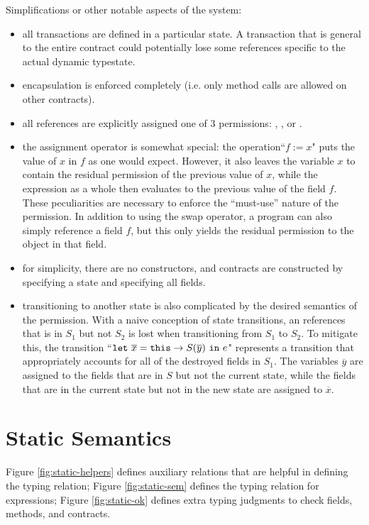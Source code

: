 \documentclass[runningheads,a4paper]{llncs}
\begin{document}
Simplifications or other notable aspects of the system:
\begin{itemize}
\item all transactions are defined in a particular state. A transaction that is general to the entire contract could potentially lose some \ownedS{} references specific to the actual dynamic typestate.
\item encapsulation is enforced completely (i.e. only method calls are allowed on other contracts).
\item all references are explicitly assigned one of 3 permissions: \readonlyS, \ownedS, or \sharedS.
\item the assignment operator is somewhat special: the operation``$f := x$" puts the value of $x$ in $f$ as one would expect. However, it also leaves the variable $x$ to contain the residual permission of the previous value of $x$, while the expression as a whole then evaluates to the previous value of the field $f$. These peculiarities are necessary to enforce the ``must-use'' nature of the \ownedS{} permission. In addition to using the swap operator, a program can also simply reference a field $f$, but this only yields the residual permission to the object in that field.
\item for simplicity, there are no constructors, and contracts are constructed by specifying a state and specifying all fields.
\item transitioning to another state is also complicated by the desired semantics of the \ownedS{} permission. With a naive conception of state transitions, an \ownedS{} references that is in $S_{1}$ but not $S_{2}$ is lost when transitioning from $S_{1}$ to $S_{2}$. To mitigate this, the transition ``$\letS\ \overline{x} = \thisS \rightarrow S(\overline{y})\ \inS\ e$" represents a transition that appropriately accounts for all of the destroyed fields in $S_{1}$. The variables $\overline{y}$ are assigned to the fields that are in $S$ but not the current state, while the fields that are in the current state but not in the new state are assigned to $\overline{x}$.
\end{itemize}

\fi

\section{Static Semantics}

\newcommand{\okS}{\textsf{Ok}}

Figure \ref{fig:static-helpers} defines auxiliary relations that are helpful in defining the typing relation; Figure \ref{fig:static-sem} defines the typing relation for expressions; Figure \ref{fig:static-ok} defines extra typing judgments to check fields, methods, and contracts.\\
\end{document}
